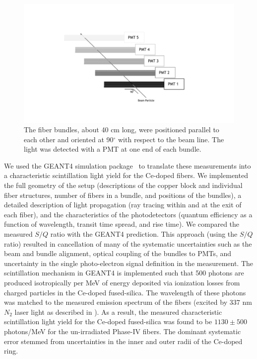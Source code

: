 \documentclass[a4paper,11pt]{article}
\begin{document}
\begin{figure}[ht]
\begin{center}\vspace{-1pc}
      \includegraphics[width=15cm]{Figures/FiberBundles.pdf}
\caption{\small The fiber bundles, about 40 cm long, were positioned parallel to each other and oriented at 90$^\circ$ with respect to the beam line. The light was detected with a PMT at one end of each bundle.}
    \label{fig:bundles}
\end{center}
\end{figure}

We used the GEANT4 simulation package~\cite{r-GEANT4} to translate these measurements into a characteristic scintillation light yield for the Ce-doped fibers.  We implemented the full geometry of the setup (descriptions of the copper block and individual fiber structures, number of fibers in a bundle, and positions of the bundles), a detailed description of light propagation (ray tracing within and at the exit of each fiber), and the characteristics of the photodetectors (quantum efficiency as a function of wavelength, transit time spread, and rise time).  We compared the measured $S/Q$ ratio with the GEANT4 prediction.  This approach (using the $S/Q$ ratio) resulted in cancellation of many of the systematic uncertainties such as the beam and bundle alignment, optical coupling of the bundles to PMTs, and uncertainty in the single photo-electron signal definition in the measurement.  The scintillation mechanism in GEANT4 is implemented such that 500 photons are produced isotropically per MeV of energy deposited via ionization losses from charged particles in the Ce-doped fused-silica. The wavelength of these photons was  matched to the measured emission spectrum of the fibers (excited by 337 nm $N_2$ laser light as described in \cite{JINSTPaper2}).  As a result, the measured characteristic scintillation light yield for the Ce-doped fused-silica was found to be $1130\pm 500$ photons/MeV for the un-irradiated Phase-IV fibers. The dominant systematic error stemmed from uncertainties in the inner and outer radii of the Ce-doped ring. 
\end{document}
